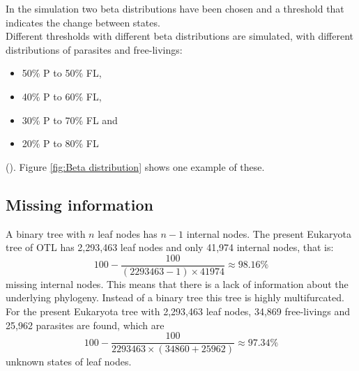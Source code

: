       In the simulation two beta distributions have been chosen and a threshold that indicates the change 
        between states. \\
      Different thresholds with different beta distributions are simulated, with different distributions 
        of parasites and free-livings:
        \begin{itemize}
          \item 50\% P to 50\% FL,
          \item 40\% P to 60\% FL,
          \item 30\% P to 70\% FL and 
          \item 20\% P to 80\% FL
        \end{itemize}
        (). Figure \ref{fig:Beta distribution} 
        shows one example of these. \\

    \subsection{Missing information} \label{sec:methods - missing information}

      A binary tree with $n$ leaf nodes has $n-1$ internal nodes. The present Eukaryota tree of OTL has 
        2,293,463 leaf nodes and only 41,974 internal nodes, that is:
      $$100-\frac{100}{(2293463-1) \times 41974} \approx 98.16 \%$$
        missing internal nodes. This means that there is a lack of information about the underlying 
        phylogeny. Instead of a binary tree this tree is highly multifurcated. \\


      For the present Eukaryota tree with 2,293,463 leaf nodes, 34,869 free-livings and 25,962 parasites 
        are found, which are
        $$100-\frac{100}{2293463 \times (34860+25962)} \approx 97.34 \%$$
        unknown states of leaf nodes. \\

